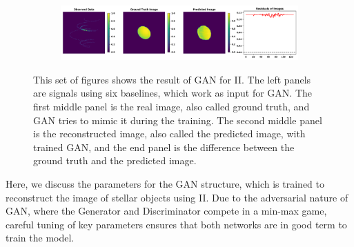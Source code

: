 \begin{figure}
\begin{subfigure}{\linewidth}
	\end{subfigure}
	\begin{subfigure}{\linewidth}
		\includegraphics[width=\linewidth]{fig/testing_image/image_47.png}
	\end{subfigure}
	\caption{This set of figures shows the result of GAN for II. The left panels are signals using six baselines, which work as input for GAN. The first middle panel is the real image, also called ground truth, and GAN tries to mimic it during the training. The second middle panel is the reconstructed image, also called the predicted image, with trained GAN, and the end panel is the difference between the ground truth and the predicted image.}
	\label{fig:GAN}
\end{figure}
Here, we discuss the parameters for the GAN structure, which is trained to reconstruct the image of stellar objects using II. Due to the adversarial nature of GAN, where the Generator and Discriminator compete in a min-max game, careful tuning of key parameters ensures that both networks are in good term to train the model.
